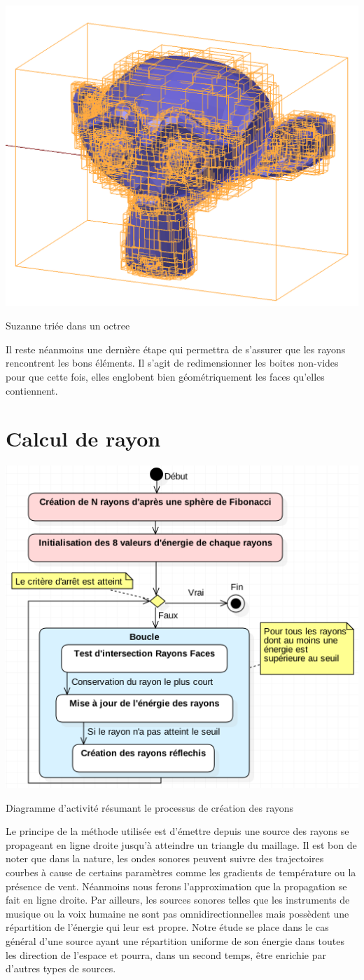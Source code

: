 \begin{figureth}
	\includegraphics[width=0.6\linewidth]{images/octreeSuzanne}
	\caption{Suzanne triée dans un \gls{octree}}
	\label{octreeSuzanne}
\end{figureth}

Il reste néanmoins une dernière étape qui permettra de s'assurer que les rayons rencontrent les bons éléments. Il s'agit de redimensionner les boites non-vides pour que cette fois, elles englobent bien géométriquement les faces qu'elles contiennent.

\section{Calcul de rayon} \label{sect_rayon}

\begin{figureth}
	\includegraphics[width=0.6\linewidth]{images/DiagRay}
	\caption{Diagramme d'activité résumant le processus de création des rayons}
	\label{DiagRay}
\end{figureth}

Le principe de la méthode utilisée est d'émettre depuis une source des rayons se propageant en ligne droite jusqu'à atteindre un triangle du maillage. Il est bon de noter que dans la nature, les ondes sonores peuvent suivre des trajectoires courbes à cause de certains paramètres comme les gradients de température ou la présence de vent. Néanmoins nous ferons l'approximation que la propagation se fait en ligne droite. Par ailleurs, les sources sonores telles que les instruments de musique ou la voix humaine ne sont pas omnidirectionnelles mais possèdent une répartition de l'énergie qui leur est propre. Notre étude se place dans le cas général d'une source ayant une répartition uniforme de son énergie dans toutes les direction de l'espace et pourra, dans un second temps, être enrichie par d'autres types de sources. 

